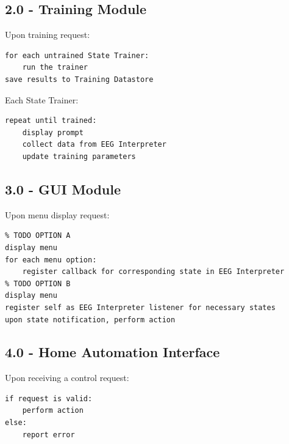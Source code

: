 \documentclass{article}
\begin{document}
\subsection*{2.0 - Training Module}

Upon training request:

\begin{lstlisting}
for each untrained State Trainer:
    run the trainer
save results to Training Datastore
\end{lstlisting}

Each State Trainer:

\begin{lstlisting}
repeat until trained:
    display prompt
    collect data from EEG Interpreter
    update training parameters
\end{lstlisting}

\subsection*{3.0 - GUI Module}

Upon menu display request:
\begin{lstlisting}
% TODO OPTION A
display menu
for each menu option:
    register callback for corresponding state in EEG Interpreter
% TODO OPTION B
display menu
register self as EEG Interpreter listener for necessary states
upon state notification, perform action
\end{lstlisting}

\subsection*{4.0 - Home Automation Interface}

Upon receiving a control request:

\begin{lstlisting}
if request is valid:
    perform action
else:
    report error
\end{lstlisting}

\newpage
\end{document}
